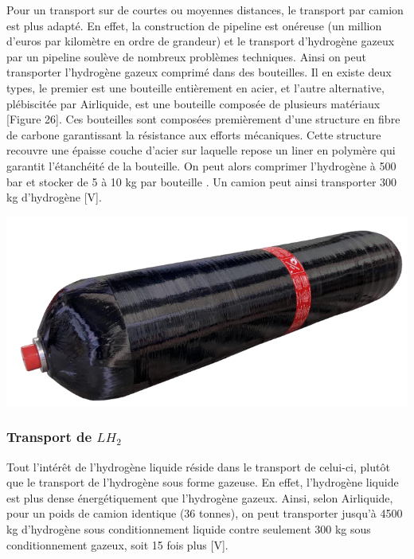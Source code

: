 \documentclass[11pt,french,a4paper]{article}
\begin{document}
\begin{multicols}{2}
Pour un transport sur de courtes ou moyennes distances, le transport par camion est plus adapté. En effet, la construction de pipeline est onéreuse (un million d’euros par kilomètre en ordre de grandeur) et le transport d’hydrogène gazeux par un pipeline soulève de nombreux problèmes techniques. Ainsi on peut transporter l’hydrogène gazeux comprimé dans des bouteilles. Il en existe deux types, le premier est une bouteille entièrement en acier, et l’autre alternative, plébiscitée par Airliquide, est une bouteille composée de plusieurs matériaux [Figure 26]. Ces bouteilles sont composées premièrement d’une structure en fibre de carbone garantissant la résistance aux efforts mécaniques. Cette structure recouvre une épaisse couche d’acier sur laquelle repose un liner en polymère qui garantit l’étanchéité de la bouteille. On peut alors comprimer l’hydrogène à 500 bar et stocker de 5 à 10 kg par bouteille \cite{MAHYTEC}. Un camion peut ainsi transporter 300 kg d’hydrogène [V].

\begin{center}
\includegraphics[width=.8\linewidth]{image/chap3/Figure 3.i-1.png}
\end{center}

\end{multicols}

\subsubsection{Transport de $LH_2$}

Tout l’intérêt de l’hydrogène liquide réside dans le transport de celui-ci, plutôt que le transport de l’hydrogène sous forme gazeuse. En effet, l’hydrogène liquide est plus dense énergétiquement que l’hydrogène gazeux. Ainsi, selon Airliquide, pour un poids de camion identique (36 tonnes), on peut transporter jusqu’à 4500 kg d’hydrogène sous conditionnement liquide contre seulement 300 kg sous conditionnement gazeux, soit 15 fois plus [V]. \\
\end{document}
